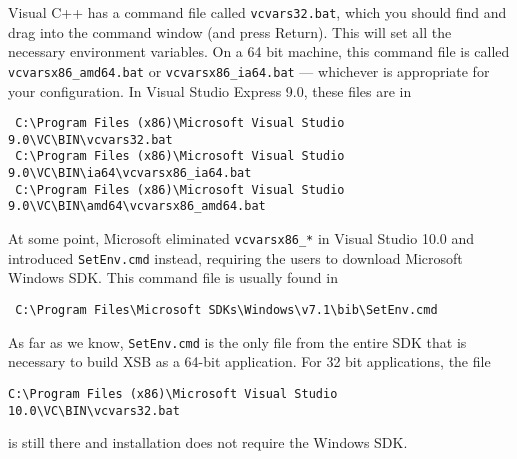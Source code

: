 \begin{enumerate}
Visual C++ has a command file called \texttt{vcvars32.bat},
which you should find and drag into the command window (and press Return).
This will set all the necessary environment variables. On a 64 bit machine,
this command file is called \texttt{vcvarsx86\_amd64.bat} or 
\texttt{vcvarsx86\_ia64.bat} ---
whichever is appropriate for your configuration. 
In Visual Studio Express 9.0, these files are in
\begin{verbatim}
 C:\Program Files (x86)\Microsoft Visual Studio 9.0\VC\BIN\vcvars32.bat
 C:\Program Files (x86)\Microsoft Visual Studio 9.0\VC\BIN\ia64\vcvarsx86_ia64.bat
 C:\Program Files (x86)\Microsoft Visual Studio 9.0\VC\BIN\amd64\vcvarsx86_amd64.bat
\end{verbatim}
At some point, Microsoft eliminated \texttt{vcvarsx86\_*} in Visual Studio 10.0
and introduced
\texttt{SetEnv.cmd} instead, requiring the users to download Microsoft
Windows SDK. This command file is usually found in 
\begin{verbatim}
 C:\Program Files\Microsoft SDKs\Windows\v7.1\bib\SetEnv.cmd
\end{verbatim}
As far as we know, \texttt{SetEnv.cmd} is the only file from the entire
SDK that is necessary to build XSB as a 64-bit application.
For 32 bit applications, the file
\begin{verbatim}
C:\Program Files (x86)\Microsoft Visual Studio 10.0\VC\BIN\vcvars32.bat 
\end{verbatim}
is still there and installation does not require the Windows SDK.



\end{enumerate}
